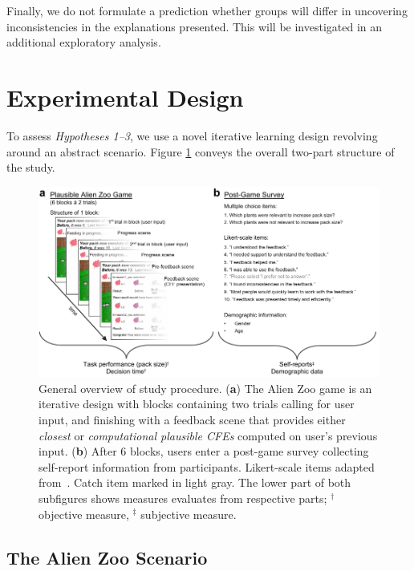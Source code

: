 Finally, we do not formulate a prediction whether groups will differ in uncovering inconsistencies in the explanations presented. This will be investigated in an additional exploratory analysis.%

\section{Experimental Design}\label{sec:experimental-design}

To assess \textit{Hypotheses 1--3}, we use a novel iterative learning design revolving around an abstract scenario. Figure \ref{fig:StudyStructure} conveys the overall two-part structure of the study.

\begin{figure}
   \centering
   \includegraphics[width=\textwidth]{./media/FigureStudyStructure.pdf}
   \caption{General overview of study procedure. (\textbf{a}) The Alien Zoo game is an iterative design with blocks containing two trials calling for user input, and finishing with a feedback scene that provides either \textit{closest} or \textit{computational plausible \glspl{CFE}} computed on user's previous input. (\textbf{b}) After 6 blocks, users enter a post-game survey collecting self-report information from participants. Likert-scale items adapted from~\citep{holzinger_measuring_2020}. Catch item marked in light gray. The lower part of both subfigures shows measures evaluates from respective parts; $^\dag$ objective measure, $^\ddag$ subjective measure.}
   \label{fig:StudyStructure}
 \end{figure}

\subsection{The Alien Zoo Scenario}

